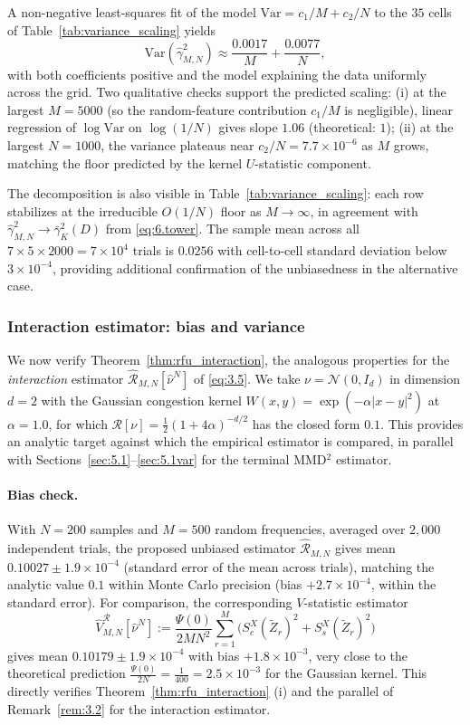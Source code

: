 \documentclass[11pt,leqno]{article}
\theoremstyle{plain}
\theoremstyle{remark}
\theoremstyle{definition}
\numberwithin{equation}{section}
\numberwithin{figure}{section}
\numberwithin{table}{section}
\numberwithin{algorithm}{section}
\begin{document}
A non-negative least-squares fit of the model $\mathrm{Var}=c_1/M + c_2/N$
to the $35$ cells of Table~\ref{tab:variance_scaling} yields
\[
 \mathrm{Var}(\hat{\gamma}_{M,N}^2) \approx \frac{0.0017}{M} + \frac{0.0077}{N},
\]
with both coefficients positive and the model explaining the data uniformly across the grid.
Two qualitative checks support the predicted scaling:
(i) at the largest $M=5000$ (so the random-feature contribution $c_1/M$ is negligible),
linear regression of $\log\mathrm{Var}$ on $\log(1/N)$ gives slope $1.06$ (theoretical: $1$);
(ii) at the largest $N=1000$, the variance plateaus near $c_2/N=7.7\times 10^{-6}$ as $M$ grows,
matching the floor predicted by the kernel $U$-statistic component.

The decomposition is also visible in Table~\ref{tab:variance_scaling}:
each row stabilizes at the irreducible $O(1/N)$ floor as $M\to\infty$,
in agreement with $\hat{\gamma}_{M,N}^2\to\bar{\gamma}_K^2(D)$ from \eqref{eq:6.tower}.
The sample mean across all $7\times 5\times 2000=7\times 10^4$ trials is $0.0256$
with cell-to-cell standard deviation below $3\times 10^{-4}$,
providing additional confirmation of the unbiasedness in the alternative case.


\subsubsection{Interaction estimator: bias and variance}\label{sec:5.1.4interaction}

We now verify Theorem~\ref{thm:rfu_interaction}, the analogous properties for the
\emph{interaction} estimator $\hat{\mathcal{R}}_{M,N}[\hat\nu^N]$ of \eqref{eq:3.5}.
We take $\nu=\mathcal{N}(0, I_d)$ in dimension $d=2$ with the Gaussian congestion kernel
$W(x,y)=\exp(-\alpha|x-y|^2)$ at $\alpha=1.0$,
for which $\mathcal{R}[\nu]=\frac{1}{2}(1+4\alpha)^{-d/2}$ has the closed form $0.1$.
This provides an analytic target against which the empirical estimator is compared,
in parallel with Sections~\ref{sec:5.1}--\ref{sec:5.1var} for the terminal MMD${}^2$ estimator.

\paragraph{Bias check.}
With $N=200$ samples and $M=500$ random frequencies,
averaged over $2{,}000$ independent trials,
the proposed unbiased estimator $\hat{\mathcal{R}}_{M,N}$ gives mean $0.10027\pm 1.9\times 10^{-4}$
(standard error of the mean across trials),
matching the analytic value $0.1$ within Monte Carlo precision (bias $+2.7\times 10^{-4}$,
within the standard error).
For comparison, the corresponding $V$-statistic estimator
\[
 \hat{V}_{M,N}^{\mathcal{R}}[\hat\nu^N]
 := \frac{\Psi(0)}{2MN^2}\sum_{r=1}^M\bigl(S_c^X(\tilde Z_r)^2+S_s^X(\tilde Z_r)^2\bigr)
\]
gives mean $0.10179\pm 1.9\times 10^{-4}$
with bias $+1.8\times 10^{-3}$, very close to the theoretical prediction
$\frac{\Psi(0)}{2N}=\frac{1}{400}=2.5\times 10^{-3}$ for the Gaussian kernel.
This directly verifies Theorem~\ref{thm:rfu_interaction} (i) and the parallel of Remark~\ref{rem:3.2}
for the interaction estimator.
\end{document}
